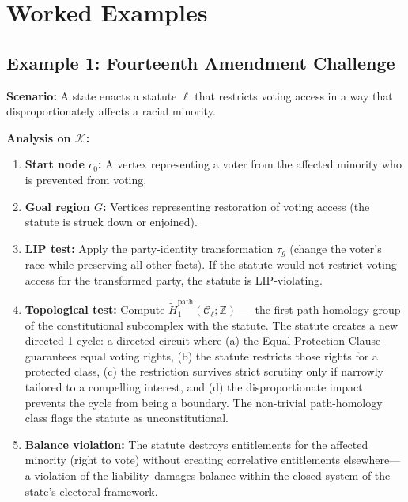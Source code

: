 \documentclass[12pt]{article}
\theoremstyle{definition}
\theoremstyle{remark}
\newcommand{\C}{\mathcal{C}}               %
\newcommand{\Z}{\mathbb{Z}}
\begin{document}
\section{Worked Examples}
\label{sec:examples}

\subsection{Example 1: Fourteenth Amendment Challenge}

\textbf{Scenario:} A state enacts a statute $\ell$ that restricts voting access in a way that disproportionately affects a racial minority.

\textbf{Analysis on $\mathcal{K}$:}
\begin{enumerate}
    \item \textbf{Start node $c_0$:} A vertex representing a voter from the affected minority who is prevented from voting.
    \item \textbf{Goal region $G$:} Vertices representing restoration of voting access (the statute is struck down or enjoined).
    \item \textbf{LIP test:} Apply the party-identity transformation $\tau_g$ (change the voter's race while preserving all other facts).  If the statute would not restrict voting access for the transformed party, the statute is LIP-violating.
    \item \textbf{Topological test:} Compute $\widetilde{H}_1^{\text{path}}(\C_\ell; \Z)$ --- the first path homology group of the constitutional subcomplex with the statute.  The statute creates a new directed 1-cycle: a directed circuit where (a) the Equal Protection Clause guarantees equal voting rights, (b) the statute restricts those rights for a protected class, (c) the restriction survives strict scrutiny only if narrowly tailored to a compelling interest, and (d) the disproportionate impact prevents the cycle from being a boundary.  The non-trivial path-homology class flags the statute as unconstitutional.
    \item \textbf{Balance violation:} The statute destroys entitlements for the affected minority (right to vote) without creating correlative entitlements elsewhere---a violation of the liability--damages balance within the closed system of the state's electoral framework.
\end{enumerate}
\end{document}
